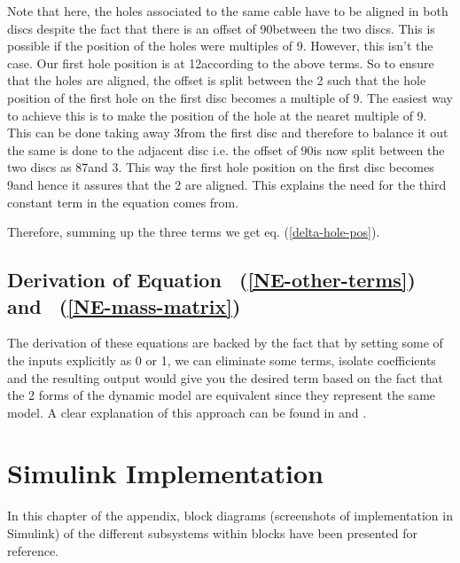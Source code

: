 \documentclass[a4paper,12pt]{report}
\begin{document}
\begin{appendices}
	Note that here, the holes associated to the same cable have to be aligned in both discs despite the fact that there is an offset of 90\textdegree between the two discs. This is possible if the position of the holes were multiples of 9. However, this isn't the case. Our first hole position is at 12\textdegree according to the above terms. So to ensure that the holes are aligned, the offset is split between the 2 such that the hole position of the first hole on the first disc becomes a multiple of 9. The easiest way to achieve this is to make the position of the hole at the nearet multiple of 9. This can be done taking away 3\textdegree from the first disc and therefore to balance it out the same is done to the adjacent disc i.e. the offset of 90\textdegree is now split between the two discs as 87\textdegree and 3\textdegree. This way the first hole position on the first disc becomes 9\textdegree and hence it assures that the 2 are aligned. This explains the need for the third constant term in the equation comes from.
	
	Therefore, summing up the three terms we get eq. (\ref{delta-hole-pos}).
	
	\section{Derivation of Equation ~(\ref{NE-other-terms}) and ~(\ref{NE-mass-matrix})}
	
	The derivation of these equations are backed by the fact that by setting some of the inputs explicitly as 0 or 1, we can eliminate some terms, isolate coefficients and the resulting output would give you the desired term based on the fact that the 2 forms of the dynamic model are equivalent since they represent the same model. A clear explanation of this approach can be found in \cite{Forward-dynamics-video} and \cite{newton-euler-pdf}.
	

	\chapter{Simulink Implementation}
	\label{appendix-d}
	In this chapter of the appendix, block diagrams (screenshots of implementation in Simulink) of the different subsystems within blocks have been presented for reference.

\end{appendices}
\end{document}
